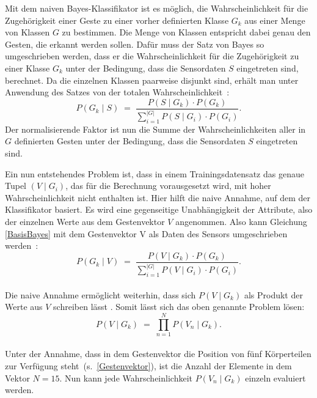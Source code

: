 Mit dem naiven Bayes-Klassifikator ist es möglich, die Wahrscheinlichkeit für die Zugehörigkeit einer Geste zu einer vorher definierten Klasse $G_k$ aus einer Menge von Klassen $G$ zu bestimmen. Die Menge von Klassen entspricht dabei genau den Gesten, die erkannt werden sollen. Dafür muss der Satz von Bayes so umgeschrieben werden, dass er die Wahrscheinlichkeit für die Zugehörigkeit zu einer Klasse $G_k$ unter der Bedingung, dass die Sensordaten $S$ eingetreten sind, berechnet. Da die einzelnen Klassen paarweise disjunkt sind, erhält man unter Anwendung des Satzes von der totalen Wahrscheinlichkeit~\cite{tuckwellWahrscheinlichkeit}:
\begin{equation} \label{BasisBayes}
    P(G_k\mid S) \; = \; \frac{P(S\mid G_k)\cdot P(G_k)}{\sum_{i=1} ^{|G|} P(S\mid G_i) \cdot P(G_i)}.
\end{equation}
Der normalisierende Faktor ist nun die Summe der Wahrscheinlichkeiten aller in $G$ definierten Gesten unter der Bedingung, dass die Sensordaten $S$ eingetreten sind.

Ein nun entstehendes Problem ist, dass in einem Trainingsdatensatz das genaue Tupel $(V\mid G_i)$, das für die Berechnung vorausgesetzt wird, mit hoher Wahrscheinlichkeit nicht enthalten ist. Hier hilft die naive Annahme, auf dem der Klassifikator basiert. Es wird eine gegenseitige Unabhängigkeit der Attribute, also der einzelnen Werte aus dem Gestenvektor $V$ angenommen. Also kann Gleichung \eqref{BasisBayes} mit dem Gestenvektor V als Daten des Sensors umgeschrieben werden~\cite{gillianANBC}:
\begin{equation}
    P(G_k\mid V) \; = \; \frac{P(V\mid G_k)\cdot P(G_k)}{\sum_{i=1} ^{|G|} P(V\mid G_i) \cdot P(G_i)}.
\end{equation} \\
Die naive Annahme ermöglicht weiterhin, dass sich $P(V\mid G_k)$ als Produkt der Werte aus $V$ schreiben lässt \cite{BouNaiveBayes, patternClassification2}. Somit lässt sich das oben genannte Problem lösen:
\begin{equation} \label{naiveBayes1}
    P(V\mid G_k) \; = \; \prod_{n=1} ^{N} P(V_n\mid G_k).
\end{equation} \\
Unter der Annahme, dass in dem Gestenvektor die Position von fünf Körperteilen zur Verfügung steht~(s.~\eqref{Gestenvektor}), ist die Anzahl der Elemente in dem Vektor $N=15$. Nun kann jede Wahrscheinlichkeit $P(V_n\mid G_k)$ einzeln evaluiert werden.~\cite{BouNaiveBayes}

